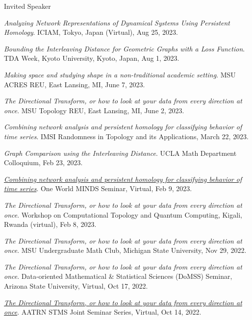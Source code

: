 \documentclass{resume} %
\begin{document}
\begin{rSection}{Invited Speaker}
\begin{etaremune}
\item\emph{Analyzing Network Representations of Dynamical Systems Using Persistent Homology}. ICIAM, Tokyo, Japan (Virtual), Aug 25, 2023. 

\item\emph{Bounding the Interleaving Distance for Geometric Graphs with a Loss Function}. TDA Week, Kyoto University, Kyoto, Japan, Aug 1, 2023. 

\item\emph{Making space and studying shape in a non-traditional academic setting}. MSU ACRES REU, East Lansing, MI, June 7, 2023. 

\item\emph{The Directional Transform, or how to look at your data from every direction at once}. MSU Topology REU, East Lansing, MI, June 2, 2023. 

\item\emph{Combining network analysis and persistent homology for classifying behavior of time series}. IMSI Randomness in Topology and its Applications, March 22, 2023. 

\item\emph{Graph Comparison using the Interleaving Distance}. UCLA Math Department Colloquium, Feb 23, 2023. 

\item\emph{\href{https://youtu.be/EYOTp1I0mwY}{Combining network analysis and persistent homology for classifying behavior of time series}}. One World MINDS Seminar, Virtual, Feb 9, 2023. 

\item\emph{The Directional Transform, or how to look at your data from every direction at once}. Workshop on Computational Topology and Quantum Computing, Kigali, Rwanda (virtual), Feb 8, 2023. 

\item\emph{The Directional Transform, or how to look at your data from every direction at once}. MSU Undergraduate Math Club, Michigan State University, Nov 29, 2022. 

\item\emph{The Directional Transform, or how to look at your data from every direction at once}. Data-oriented Mathematical \& Statistical Sciences (DoMSS) Seminar, Arizona State University, Virtual, Oct 17, 2022. 

\item\emph{\href{https://www.youtube.com/watch?v=_-gDBosxp2M}{The Directional Transform, or how to look at your data from every direction at once}}. AATRN STMS Joint Seminar Series, Virtual, Oct 14, 2022. 


\end{etaremune}
\end{rSection}
\end{document}
